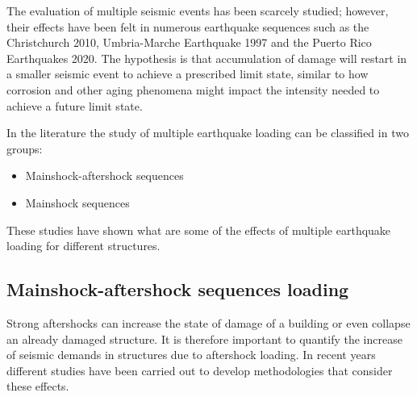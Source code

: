 The evaluation of multiple seismic events has been scarcely studied; however, their effects have been felt in numerous earthquake sequences such as the Christchurch 2010, Umbria-Marche Earthquake 1997 and the Puerto Rico Earthquakes 2020. The hypothesis is that accumulation of damage will restart in a smaller seismic event to achieve a prescribed limit state, similar to how corrosion and other aging phenomena might impact the intensity needed to achieve a future limit state. 

In the literature the study of multiple earthquake loading can be classified in two groups:

\begin{itemize}
	\item Mainshock-aftershock sequences
	\item Mainshock sequences
\end{itemize}

These studies have shown what are some of the effects of multiple earthquake loading for different structures.

\subsection{Mainshock-aftershock sequences loading }

Strong aftershocks can increase the state of damage of a building or even collapse an already damaged structure. It is therefore important to quantify the increase of seismic demands in structures due to aftershock loading. In recent years different studies have been carried out to develop methodologies that consider these effects.

